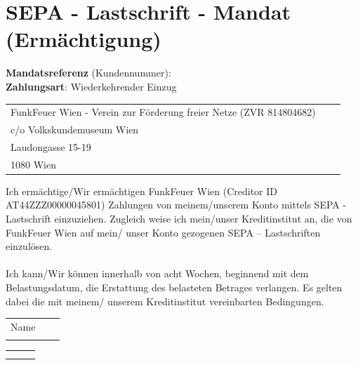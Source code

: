 \documentclass[parskip=half]{scrreprt}
\begin{document}
\renewcommand*\chapterheadstartvskip{\vspace*{25pt}}
\chapter*{SEPA - Lastschrift - Mandat (Ermächtigung)}
\thispagestyle{fancy}

\textbf{Mandatsreferenz}  (Kundennummer): \MandateRef \\
\textbf{Zahlungsart}: Wiederkehrender Einzug\\

\begin{tabular}{p{15cm}p{0.5cm}l}
\hspace*{10mm} FunkFeuer Wien - Verein zur Förderung freier Netze (ZVR 814804682)\\
\hspace*{10mm} c/o Volkskundemuseum Wien\\
\hspace*{10mm} Laudongasse 15-19\\
\hspace*{10mm} 1080 Wien
\end{tabular}%

\vspace{0,5 cm}

\begin{contract}
Ich ermächtige/Wir ermächtigen FunkFeuer Wien (Creditor ID AT44ZZZ00000045801) Zahlungen von meinem/unserem Konto mittels SEPA - Lastschrift einzuziehen. Zugleich weise ich mein/unser Kreditinstitut an, die von FunkFeuer Wien auf mein/ unser Konto gezogenen SEPA – Lastschriften einzulösen.\\ \\
Ich kann/Wir können innerhalb von acht Wochen, beginnend mit dem Belastungsdatum, die Erstattung des belasteten Betrages verlangen. Es gelten dabei die mit meinem/ unserem Kreditinstitut vereinbarten Bedingungen.
\end{contract}


\begin{tabular}{p{4cm}p{.5cm}l}
\hspace*{10mm} Name \\ \\
\end{tabular}
\begin{tabular}{p{13cm}p{.5cm}l}
\dotfill \\ \\
\end{tabular}
\end{document}
